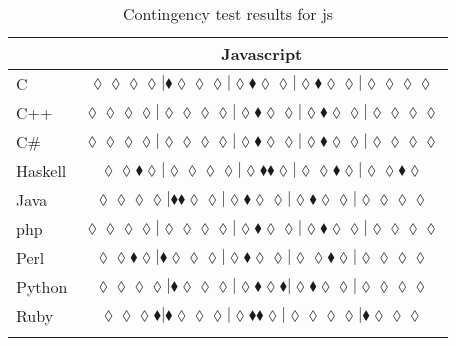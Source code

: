 \begin{table*}
\centering
\begin{tabular}{l c}
& Javascript \\
\hline

C & $\scriptscriptstyle\lozenge\lozenge\lozenge\lozenge|\blacklozenge\lozenge\lozenge\lozenge|\lozenge\blacklozenge\lozenge\lozenge|\lozenge\blacklozenge\lozenge\lozenge|\lozenge\lozenge\lozenge\lozenge$ \\
C++ & $\scriptscriptstyle\lozenge\lozenge\lozenge\lozenge|\lozenge\lozenge\lozenge\lozenge|\lozenge\blacklozenge\lozenge\lozenge|\lozenge\blacklozenge\lozenge\lozenge|\lozenge\lozenge\lozenge\lozenge$ \\
C\# & $\scriptscriptstyle\lozenge\lozenge\lozenge\lozenge|\lozenge\lozenge\lozenge\lozenge|\lozenge\blacklozenge\lozenge\lozenge|\lozenge\blacklozenge\lozenge\lozenge|\lozenge\lozenge\lozenge\lozenge$ \\
Haskell & $\scriptscriptstyle\lozenge\lozenge\blacklozenge\lozenge|\lozenge\lozenge\lozenge\lozenge|\lozenge\blacklozenge\blacklozenge\lozenge|\lozenge\lozenge\blacklozenge\lozenge|\lozenge\lozenge\blacklozenge\lozenge$ \\
Java & $\scriptscriptstyle\lozenge\lozenge\lozenge\lozenge|\blacklozenge\blacklozenge\lozenge\lozenge|\lozenge\blacklozenge\lozenge\lozenge|\lozenge\blacklozenge\lozenge\lozenge|\lozenge\lozenge\lozenge\lozenge$ \\
{\sc php} & $\scriptscriptstyle\lozenge\lozenge\lozenge\lozenge|\lozenge\lozenge\lozenge\lozenge|\lozenge\blacklozenge\lozenge\lozenge|\lozenge\blacklozenge\lozenge\lozenge|\lozenge\lozenge\lozenge\lozenge$ \\
Perl & $\scriptscriptstyle\lozenge\lozenge\blacklozenge\lozenge|\blacklozenge\lozenge\lozenge\lozenge|\lozenge\blacklozenge\lozenge\lozenge|\lozenge\lozenge\blacklozenge\lozenge|\lozenge\lozenge\lozenge\lozenge$ \\
Python & $\scriptscriptstyle\lozenge\lozenge\lozenge\lozenge|\blacklozenge\lozenge\lozenge\lozenge|\lozenge\blacklozenge\lozenge\blacklozenge|\lozenge\blacklozenge\lozenge\lozenge|\lozenge\lozenge\lozenge\lozenge$ \\
Ruby & $\scriptscriptstyle\lozenge\lozenge\lozenge\blacklozenge|\blacklozenge\lozenge\lozenge\lozenge|\lozenge\blacklozenge\blacklozenge\lozenge|\lozenge\lozenge\lozenge\lozenge|\blacklozenge\lozenge\lozenge\lozenge$ \\

\hline
& \\
\end{tabular}
\caption{Contingency test results for js}
\label{tbl:contingency-test-results-js}
\end{table*}



